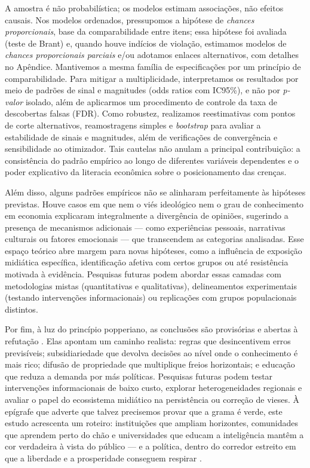 A amostra é não probabilística; os modelos estimam associações, não efeitos causais. Nos modelos ordenados, pressupomos a hipótese de \textit{chances proporcionais}, base da comparabilidade entre itens; essa hipótese foi avaliada (teste de Brant) e, quando houve indícios de violação, estimamos modelos de \textit{chances proporcionais parciais} e/ou adotamos enlaces alternativos, com detalhes no Apêndice. Mantivemos a mesma família de especificações por um princípio de comparabilidade. Para mitigar a multiplicidade, interpretamos os resultados por meio de padrões de sinal e magnitudes (odds ratios com IC95\%), e não por \textit{p-valor} isolado, além de aplicarmos um procedimento de controle da taxa de descobertas falsas (FDR). Como robustez, realizamos reestimativas com pontos de corte alternativos, reamostragens simples e \textit{bootstrap} para avaliar a estabilidade de sinais e magnitudes, além de verificações de convergência e sensibilidade ao otimizador. Tais cautelas não anulam a principal contribuição: a consistência do padrão empírico ao longo de diferentes variáveis dependentes e o poder explicativo da literacia econômica sobre o posicionamento das crenças.

Além disso, alguns padrões empíricos não se alinharam perfeitamente às hipóteses previstas. Houve casos em que nem o viés ideológico nem o grau de conhecimento em economia explicaram integralmente a divergência de opiniões, sugerindo a presença de mecanismos adicionais — como experiências pessoais, narrativas culturais ou fatores emocionais — que transcendem as categorias analisadas. Esse espaço teórico abre margem para novas hipóteses, como a influência de exposição midiática específica, identificação afetiva com certos grupos ou até resistência motivada à evidência. Pesquisas futuras podem abordar essas camadas com metodologias mistas (quantitativas e qualitativas), delineamentos experimentais (testando intervenções informacionais) ou replicações com grupos populacionais distintos.

Por fim, à luz do princípio popperiano, as conclusões são provisórias e abertas à refutação \cite{popperlogic}. Elas apontam um caminho realista: regras que desincentivem erros previsíveis; subsidiariedade que devolva decisões ao nível onde o conhecimento é mais rico; difusão de propriedade que multiplique freios horizontais; e educação que reduza a demanda por más políticas. Pesquisas futuras podem testar intervenções informacionais de baixo custo, explorar heterogeneidades regionais e avaliar o papel do ecossistema midiático na persistência ou correção de vieses. À epígrafe que adverte que talvez precisemos provar que a grama é verde, este estudo acrescenta um roteiro: instituições que ampliam horizontes, comunidades que aprendem perto do chão e universidades que educam a inteligência mantêm a cor verdadeira à vista do público — e a política, dentro do corredor estreito em que a liberdade e a prosperidade conseguem respirar \cite{acemoglu2019narrow,Acemoglu2019}.
